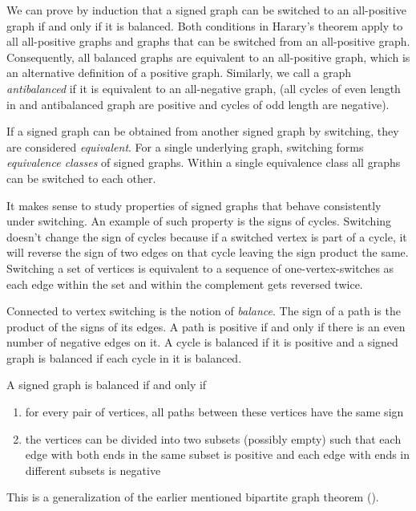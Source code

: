 We can prove by induction that a signed graph can be switched to an all-positive graph if and only if it is balanced. Both conditions in Harary's theorem apply to all all-positive graphs and graphs that can be switched from an all-positive graph. Consequently, all balanced graphs are equivalent to an all-positive graph, which is an alternative definition of a positive graph. Similarly, we call a graph \textit{antibalanced} if it is equivalent to an all-negative graph, (all cycles of even length in and antibalanced graph are positive and cycles of odd length are negative).

If a signed graph can be obtained from another signed graph by switching, they are considered \textit{equivalent}. For a single underlying graph, switching forms \textit{equivalence classes} of signed graphs. Within a single equivalence class all graphs can be switched to each other.

It makes sense to study properties of signed graphs that behave consistently under switching. An example of such property is the signs of cycles. Switching doesn't change the sign of cycles because if a switched vertex is part of a cycle, it will reverse the sign of two edges on that cycle leaving the sign product the same. Switching a set of vertices is equivalent to a sequence of one-vertex-switches as each edge within the set and within the complement gets reversed twice.

Connected to vertex switching is the notion of \textit{balance}. The sign of a path is the product of the signs of its edges. A path is positive if and only if there is an even number of negative edges on it. A cycle is balanced if it is positive and a signed graph is balanced if each cycle in it is balanced\cite{harary}.

\begin{theorem}[Harary]\label{th:harary}
    A signed graph is balanced if and only if
    \begin{enumerate}
        \item for every pair of vertices, all paths between these vertices have the same sign
        \item the vertices can be divided into two subsets (possibly empty) such that each edge with both ends in the same subset is positive and each edge with ends in different subsets is negative
    \end{enumerate}

    This is a generalization of the earlier mentioned bipartite graph theorem ().
\end{theorem}

